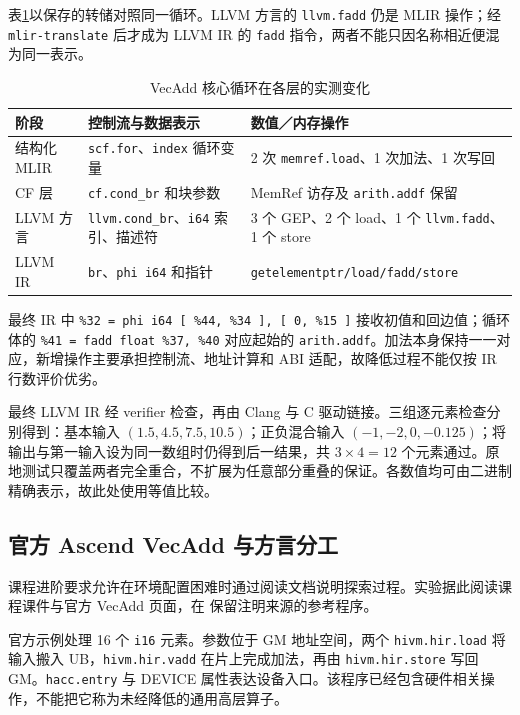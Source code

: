 \documentclass[UTF8,a4paper,10pt,fontset=fandol]{ctexart}
\begin{document}
表\ref{tab:lowering}以保存的转储对照同一循环。LLVM 方言的 \texttt{llvm.fadd} 仍是 MLIR 操作；经 \texttt{mlir-translate} 后才成为 LLVM IR 的 \texttt{fadd} 指令，两者不能只因名称相近便混为同一表示。
\begin{table}[H]
\centering\small
\caption{VecAdd 核心循环在各层的实测变化}\label{tab:lowering}
\begin{tabularx}{\textwidth}{lXX}
\toprule
阶段 & 控制流与数据表示 & 数值／内存操作\\
\midrule
结构化 MLIR & \texttt{scf.for}、\texttt{index} 循环变量 & 2 次 \texttt{memref.load}、1 次加法、1 次写回\\
CF 层 & \texttt{cf.cond\_br} 和块参数 & MemRef 访存及 \texttt{arith.addf} 保留\\
LLVM 方言 & \texttt{llvm.cond\_br}、\texttt{i64} 索引、描述符 & 3 个 GEP、2 个 load、1 个 \texttt{llvm.fadd}、1 个 store\\
LLVM IR & \texttt{br}、\texttt{phi i64} 和指针 & \texttt{getelementptr/load/fadd/store}\\
\bottomrule
\end{tabularx}
\end{table}
最终 IR 中 \texttt{\%32 = phi i64 [ \%44, \%34 ], [ 0, \%15 ]} 接收初值和回边值；循环体的 \texttt{\%41 = fadd float \%37, \%40} 对应起始的 \texttt{arith.addf}。加法本身保持一一对应，新增操作主要承担控制流、地址计算和 ABI 适配，故降低过程不能仅按 IR 行数评价优劣。

最终 LLVM IR 经 verifier 检查，再由 Clang 与 C 驱动链接。三组逐元素检查分别得到：基本输入 $(1.5,4.5,7.5,10.5)$；正负混合输入 $(-1,-2,0,-0.125)$；将输出与第一输入设为同一数组时仍得到后一结果，共 $3\times4=12$ 个元素通过。原地测试只覆盖两者完全重合，不扩展为任意部分重叠的保证。各数值均可由二进制精确表示，故此处使用等值比较。

\subsection{官方 Ascend VecAdd 与方言分工}
课程进阶要求允许在环境配置困难时通过阅读文档说明探索过程。实验据此阅读课程课件与官方 VecAdd 页面\cite{guide,ascend,bisheng}，在  保留注明来源的参考程序。

官方示例处理 16 个 \texttt{i16} 元素。参数位于 GM 地址空间，两个 \texttt{hivm.hir.load} 将输入搬入 UB，\texttt{hivm.hir.vadd} 在片上完成加法，再由 \texttt{hivm.hir.store} 写回 GM。\texttt{hacc.entry} 与 DEVICE 属性表达设备入口。该程序已经包含硬件相关操作，不能把它称为未经降低的通用高层算子。
\end{document}
